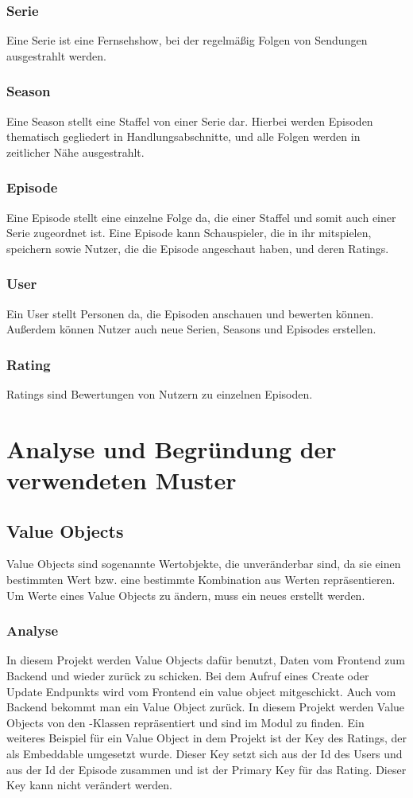 \subsubsection{Serie}
Eine Serie ist eine Fernsehshow, bei der regelmäßig Folgen von Sendungen ausgestrahlt werden.
\subsubsection{Season}
Eine Season stellt eine Staffel von einer Serie dar. Hierbei werden Episoden thematisch gegliedert in Handlungsabschnitte, und alle Folgen werden in zeitlicher Nähe ausgestrahlt.
\subsubsection{Episode}
Eine Episode stellt eine einzelne Folge da, die einer Staffel und somit auch einer Serie zugeordnet ist. Eine Episode kann Schauspieler, die in ihr mitspielen, speichern sowie Nutzer, die die Episode angeschaut haben, und deren Ratings.
\subsubsection{User}
Ein User stellt Personen da, die Episoden anschauen und bewerten können. Außerdem können Nutzer auch neue Serien, Seasons und Episodes erstellen.
\subsubsection{Rating}
Ratings sind Bewertungen von Nutzern zu einzelnen Episoden.

\section{Analyse und Begründung der verwendeten Muster}

    \subsection{Value Objects}
    Value Objects sind sogenannte Wertobjekte, die unveränderbar sind, da sie einen bestimmten Wert bzw. eine bestimmte Kombination aus Werten repräsentieren. Um Werte eines Value Objects zu ändern, muss ein neues erstellt werden.

        \subsubsection{Analyse}
        In diesem Projekt werden Value Objects dafür benutzt, Daten vom Frontend zum Backend und wieder zurück zu schicken. Bei dem Aufruf eines Create oder Update Endpunkts wird vom Frontend ein value object mitgeschickt. Auch vom Backend bekommt man ein Value Object zurück. In diesem Projekt werden Value Objects von den -Klassen repräsentiert und sind im Modul  zu finden.
        Ein weiteres Beispiel für ein Value Object in dem Projekt ist der Key des Ratings, der als Embeddable umgesetzt wurde. Dieser Key setzt sich aus der Id des Users und aus der Id der Episode zusammen und ist der Primary Key für das Rating. Dieser Key kann nicht verändert werden.

